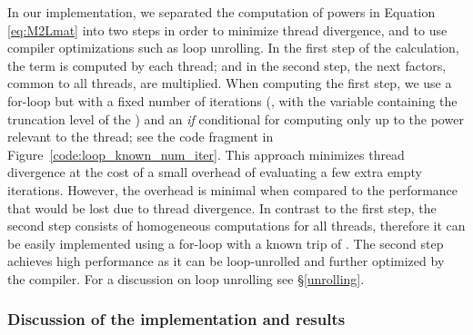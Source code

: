 In our implementation, we separated the computation of powers in Equation \eqref{eq:M2Lmat} into two steps in order to minimize thread divergence, and to use compiler optimizations such as loop unrolling. In the first step of the calculation, the term  is computed by each thread; and in the second step, the next    factors, common to all threads, are multiplied. When computing the first step, we use a for-loop but with a fixed number of iterations (, with  the variable containing the truncation level of the {\ME}) and an \emph{if} conditional for computing only up to the power relevant to the thread; see the code fragment in Figure~\ref{code:loop_known_num_iter}. This approach minimizes thread divergence at the cost of a small overhead of evaluating a few extra empty iterations. However, the overhead is minimal when compared to the performance that would be lost due to thread divergence. In contrast to the first step, the second step consists of homogeneous computations for all threads, therefore it can be easily implemented using a for-loop with a known trip of . The second step achieves high performance as it can be loop-unrolled and further optimized by the compiler. For a discussion on loop unrolling see \S\ref{unrolling}.


\subsubsection{Discussion of the {\ML} {\gpu} implementation and results}

